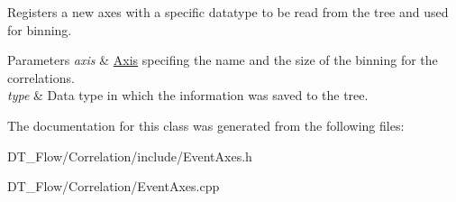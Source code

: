 Registers a new axes with a specific datatype to be read from the tree and used for binning. 


\begin{DoxyParams}{Parameters}
{\em axis} & \mbox{\hyperlink{classQn_1_1Axis}{Axis}} specifing the name and the size of the binning for the correlations. \\
\hline
{\em type} & Data type in which the information was saved to the tree. \\
\hline
\end{DoxyParams}


The documentation for this class was generated from the following files\+:\begin{DoxyCompactItemize}
\item 
D\+T\+\_\+\+Flow/\+Correlation/include/Event\+Axes.\+h\item 
D\+T\+\_\+\+Flow/\+Correlation/Event\+Axes.\+cpp\end{DoxyCompactItemize}

